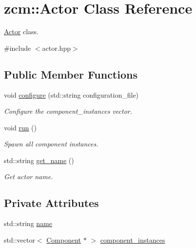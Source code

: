 \hypertarget{classzcm_1_1Actor}{}\section{zcm\+:\+:Actor Class Reference}
\label{classzcm_1_1Actor}


\hyperlink{classzcm_1_1Actor}{Actor} class.  




{\ttfamily \#include $<$actor.\+hpp$>$}

\subsection*{Public Member Functions}
\begin{DoxyCompactItemize}
\item 
void \hyperlink{classzcm_1_1Actor_a28d09bc2ef3635296c988a2b32d10c0b}{configure} (std\+::string configuration\+\_\+file)
\begin{DoxyCompactList}\small\item\em Configure the component\+\_\+instances vector. \end{DoxyCompactList}\item 
void \hyperlink{classzcm_1_1Actor_a5d968074bf915f3e021cc287bff27879}{run} ()
\begin{DoxyCompactList}\small\item\em Spawn all component instances. \end{DoxyCompactList}\item 
std\+::string \hyperlink{classzcm_1_1Actor_ae81346a318c26d68a5b78848ead2518f}{get\+\_\+name} ()
\begin{DoxyCompactList}\small\item\em Get actor name. \end{DoxyCompactList}\end{DoxyCompactItemize}
\subsection*{Private Attributes}
\begin{DoxyCompactItemize}
\item 
std\+::string \hyperlink{classzcm_1_1Actor_a2b0816bbe28c8f96fa882b625be004ee}{name}
\item 
std\+::vector$<$ \hyperlink{classzcm_1_1Component}{Component} $\ast$ $>$ \hyperlink{classzcm_1_1Actor_abb7a2cdfc286c8821ac6f9ad3da40a49}{component\+\_\+instances}
\end{DoxyCompactItemize}


